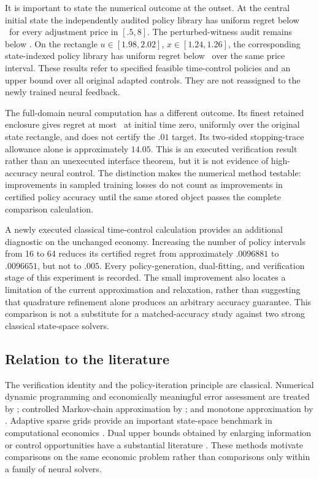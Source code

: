 It is important to state the numerical outcome at the outset. At the central initial state the independently audited policy library has uniform regret below \pricebound\ for every adjustment price in $[.5,8]$. The perturbed-witness audit remains below \stressbound. On the rectangle $u\in[1.98,2.02]$, $x\in[1.24,1.26]$, the corresponding state-indexed policy library has uniform regret below \statebound\ over the same price interval. These results refer to specified feasible time-control policies and an upper bound over all original adapted controls. They are not reassigned to the newly trained neural feedback.

The full-domain neural computation has a different outcome. Its finest retained enclosure gives regret at most \neuralbound\ at initial time zero, uniformly over the original state rectangle, and does not certify the $.01$ target. Its two-sided stopping-trace allowance alone is approximately $14.05$. This is an executed verification result rather than an unexecuted interface theorem, but it is not evidence of high-accuracy neural control. The distinction makes the numerical method testable: improvements in sampled training losses do not count as improvements in certified policy accuracy until the same stored object passes the complete comparison calculation.

A newly executed classical time-control calculation provides an additional diagnostic on the unchanged economy. Increasing the number of policy intervals from 16 to 64 reduces its certified regret from approximately $.0096881$ to $.0096651$, but not to $.005$. Every policy-generation, dual-fitting, and verification stage of this experiment is recorded. The small improvement also locates a limitation of the current approximation and relaxation, rather than suggesting that quadrature refinement alone produces an arbitrary accuracy guarantee. This comparison is not a substitute for a matched-accuracy study against two strong classical state-space solvers.

\subsection{Relation to the literature}
The verification identity and the policy-iteration principle are classical. Numerical dynamic programming and economically meaningful error assessment are treated by \citet{Judd1998}; controlled Markov-chain approximation by \citet{KushnerDupuis2001}; and monotone approximation by \citet{BarlesSouganidis1991}. Adaptive sparse grids provide an important state-space benchmark in computational economics \citep{BrummScheidegger2017}. Dual upper bounds obtained by enlarging information or control opportunities have a substantial literature \citep{BrownSmithSun2010,BrownSmith2011}. These methods motivate comparisons on the same economic problem rather than comparisons only within a family of neural solvers.

